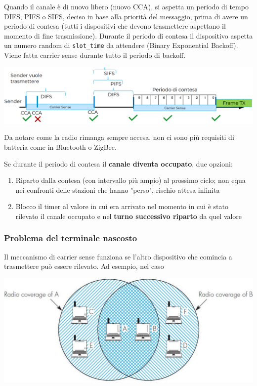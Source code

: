 Quando il canale è di nuovo libero (nuovo CCA), si aspetta un periodo di tempo DIFS, PIFS o SIFS, deciso in base alla priorità del messaggio, prima di avere un periodo di contesa (tutti i dispositivi che devono trasmettere aspettano il momento di fine trasmissione). Durante il periodo di contesa il dispositivo aspetta un numero random di \texttt{slot\_time} da attendere (Binary Exponential Backoff). Viene fatta carrier sense durante tutto il periodo di backoff.
\begin{center}
	\includegraphics[width=0.98\linewidth]{img/wlan/occupied1}
\end{center}

Da notare come la radio rimanga sempre accesa, non ci sono più requisiti di batteria come in Bluetooth o ZigBee.

Se durante il periodo di contesa il \textbf{canale diventa occupato}, due opzioni:
\begin{enumerate}
	\item Riparto dalla contesa (con intervallo più ampio) al prossimo ciclo; non equa nei confronti delle stazioni che hanno "perso", rischio attesa infinita
    
	\item Blocco il timer al valore in cui era arrivato nel momento in cui è stato rilevato il canale occupato e nel \textbf{turno successivo riparto} da quel valore
\end{enumerate}

\subsubsection{Problema del terminale nascosto}

Il meccanismo di carrier sense funziona se l'altro dispositivo che comincia a trasmettere può essere rilevato. Ad esempio, nel caso
\begin{center}
	\includegraphics[width=0.8\linewidth]{img/wlan/sneaky}
\end{center}

